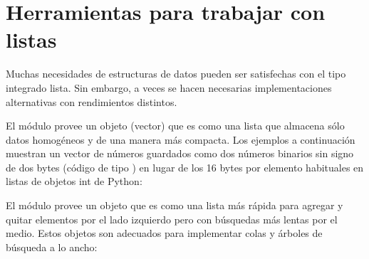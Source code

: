 \documentclass[a4,10pt,spanish]{sphinxmanual}
\begin{document}
\section{Herramientas para trabajar con listas}
\label{\detokenize{tutorial/stdlib2:tools-for-working-with-lists}}\label{\detokenize{tutorial/stdlib2:tut-list-tools}}
\sphinxAtStartPar
Muchas necesidades de estructuras de datos pueden ser satisfechas con el tipo integrado lista.  Sin embargo, a veces se hacen necesarias implementaciones alternativas con rendimientos distintos.

\sphinxAtStartPar
El módulo  provee un objeto  (vector) que es como una lista que almacena sólo datos homogéneos y de una manera más compacta.  Los ejemplos a continuación muestran un vector de números guardados como dos números binarios sin signo de dos bytes (código de tipo ) en lugar de los 16 bytes por elemento habituales en listas de objetos int de Python:

\begin{sphinxVerbatim}[commandchars=\\\{\}]
   
   \PYG{p}{[}   \PYG{p}{]}
\PYG{p}{[}\PYG{p}{]}
\end{sphinxVerbatim}

\sphinxAtStartPar
El módulo  provee un objeto  que es como una lista más rápida para agregar y quitar elementos por el lado izquierdo pero con búsquedas más lentas por el medio.  Estos objetos son adecuados para implementar colas y árboles de búsqueda a lo ancho:
\end{document}
